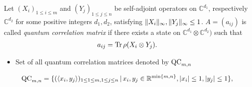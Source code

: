 \begin{frame}
	\begin{definition}
		Let $ (X_i)_{1 \le i \le m } $ and $ (Y_j)_{1 \le j \le n} $ be self-adjoint operators on $ \mathbb{C}^{d_1} $, respectively $ \mathbb{C}^{d_2} $ for some positive integers $ d_1,d_2 $, satisfying $  \Vert {X_i} \Vert_{\infty},  \Vert {Y_j} \Vert_{\infty} \le 1 $. $ A = (a_{ij}) $ is called {\itshape quantum correlation matrix} if there exists a state on $\mathbb{C}^{d_1} \otimes \mathbb{C}^{d_2})$ such that 
		\begin{align*}\label{QCaij}
		a_{ij} = \text{Tr} \, {\rho (X_i \otimes Y_j)} .
		\end{align*}
	\end{definition}
	\pause
	\begin{itemize}
		\item Set of all quantum correlation matrices denoted by $ \textup{QC}_{m,n} $
		\pause
	\end{itemize}
	\begin{lemma}
		\begin{align*}
		\textup{QC}_{m,n} = \{ (\langle x_i,y_j \rangle)_{1 \le 1 \le m, 1 \le j \le n} \,| \, x_i,y_j \in \mathbb{R}^{ \min \{m,n \} }, \vert x_i  \vert \le 1, \vert y_j \vert \le 1  \},
		\end{align*}
	\end{lemma}
\end{frame}

